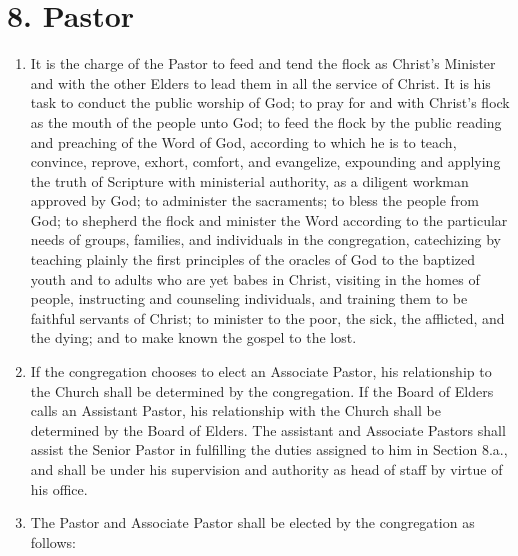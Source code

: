 \documentclass[
]{book}
\begin{document}
\hypertarget{pastor}{%
\section{8. Pastor}\label{pastor}}

\begin{enumerate}
\def\labelenumi{\alph{enumi}.}
\item
  It is the charge of the Pastor to feed and tend the flock as Christ's Minister and with the other Elders to lead them in all the service of Christ. It is his task to conduct the public worship of God; to pray for and with Christ's flock as the mouth of the people unto God; to feed the flock by the public reading and preaching of the Word of God, according to which he is to teach, convince, reprove, exhort, comfort, and evangelize, expounding and applying the truth of Scripture with ministerial authority, as a diligent workman approved by God; to administer the sacraments; to bless the people from God; to shepherd the flock and minister the Word according to the particular needs of groups, families, and individuals in the congregation, catechizing by teaching plainly the first principles of the oracles of God to the baptized youth and to adults who are yet babes in Christ, visiting in the homes of people, instructing and counseling individuals, and training them to be faithful servants of Christ; to minister to the poor, the sick, the afflicted, and the dying; and to make known the gospel to the lost.
\item
  If the congregation chooses to elect an Associate Pastor, his relationship to the Church shall be determined by the congregation. If the Board of Elders calls an Assistant Pastor, his relationship with the Church shall be determined by the Board of Elders. The assistant and Associate Pastors shall assist the Senior Pastor in fulfilling the duties assigned to him in Section 8.a., and shall be under his supervision and authority as head of staff by virtue of his office.
\item
  The Pastor and Associate Pastor shall be elected by the congregation as follows:


\end{enumerate}
\end{document}
